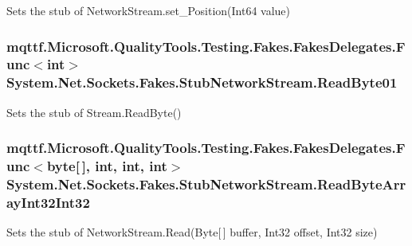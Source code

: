Sets the stub of Network\-Stream.\-set\-\_\-\-Position(\-Int64 value)

\hypertarget{class_system_1_1_net_1_1_sockets_1_1_fakes_1_1_stub_network_stream_a2fffdd58c94d592950b8c75e705de988}{
\subsubsection[{Read\-Byte01}]{\setlength{\rightskip}{0pt plus 5cm}mqttf.\-Microsoft.\-Quality\-Tools.\-Testing.\-Fakes.\-Fakes\-Delegates.\-Func$<$int$>$ System.\-Net.\-Sockets.\-Fakes.\-Stub\-Network\-Stream.\-Read\-Byte01}}\label{class_system_1_1_net_1_1_sockets_1_1_fakes_1_1_stub_network_stream_a2fffdd58c94d592950b8c75e705de988}


Sets the stub of Stream.\-Read\-Byte()

\hypertarget{class_system_1_1_net_1_1_sockets_1_1_fakes_1_1_stub_network_stream_a41f6c35c91d6f30989a4b1c0fbb1425b}{
\subsubsection[{Read\-Byte\-Array\-Int32\-Int32}]{\setlength{\rightskip}{0pt plus 5cm}mqttf.\-Microsoft.\-Quality\-Tools.\-Testing.\-Fakes.\-Fakes\-Delegates.\-Func$<$byte\mbox{[}$\,$\mbox{]}, int, int, int$>$ System.\-Net.\-Sockets.\-Fakes.\-Stub\-Network\-Stream.\-Read\-Byte\-Array\-Int32\-Int32}}\label{class_system_1_1_net_1_1_sockets_1_1_fakes_1_1_stub_network_stream_a41f6c35c91d6f30989a4b1c0fbb1425b}


Sets the stub of Network\-Stream.\-Read(\-Byte\mbox{[}$\,$\mbox{]} buffer, Int32 offset, Int32 size)

